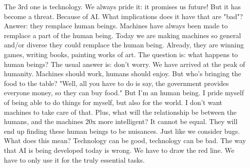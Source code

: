 \documentclass{Article}
\begin{document}
The 3rd one is technology. We always pride it: it promises us future! But it has become a threat. Because of AI. What implications does it have that are "bad"? Answer: they remplace human beings. Machines have always been made to remplace a part of the human being. Today we are making machines so general and/or diverse they could remplace the human being. Already, they are winning games, writing books, painting works of art. The question is: what happens to human beings? The usual answer is: don't worry. We have arrived at the peak of humanity. Machines should work, humans should enjoy. But who's bringing the food to the table? "Well, all you have to do is say, the government provides everyone money, so they can buy food." But I'm an human being. I pride myself of being able to do things for myself, but also for the world. I don't want machines to take care of that. Plus, what will the relationship be between the humans, and the machines 20x more intelligent? It cannot be equal. They will end up finding these human beings to be nuisances. Just like we consider bugs. \\
What does this mean? Technology can be good, technology can be bad. The way that AI is being developed today is wrong. We have to draw the red line. We have to only use it for the truly essential tasks.
\end{document}
